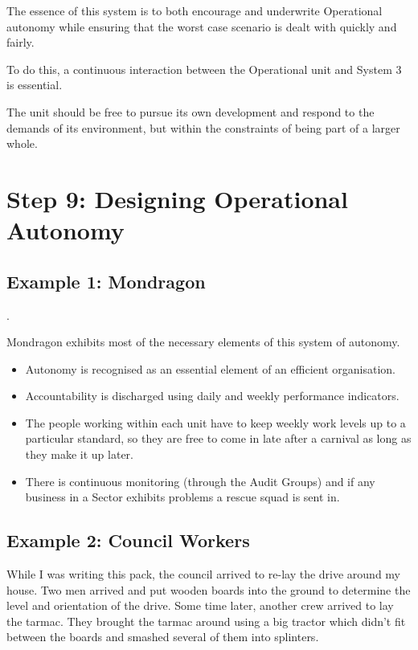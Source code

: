 The essence of this system is to both encourage and underwrite Operational autonomy while ensuring that the worst case scenario is dealt with quickly and fairly.

To do this, a continuous interaction between the Operational unit and System 3 is essential.

The unit should be free to pursue its own development and respond to the demands of its environment, but within the constraints of being part of a larger whole.

\section*{Step 9: Designing Operational Autonomy}

\subsection*{Example 1: Mondragon}
.

Mondragon exhibits most of the necessary elements of this system of autonomy.

\begin{itemize}
  \item Autonomy is recognised as an essential element of an efficient organisation.

  \item Accountability is discharged using daily and weekly performance indicators.

  \item The people working within each unit have to keep weekly work levels up to a particular standard, so they are free to come in late after a carnival as long as they make it up later.

  \item There is continuous monitoring (through the Audit Groups) and if any business in a Sector exhibits problems a rescue squad is sent in.

\end{itemize}

\subsection*{Example 2: Council Workers}
While I was writing this pack, the council arrived to re-lay the drive around my house. Two men arrived and put wooden boards into the ground to determine the level and orientation of the drive. Some time later, another crew arrived to lay the tarmac. They brought the tarmac around using a big tractor which didn't fit between the boards and smashed several of them into splinters.

